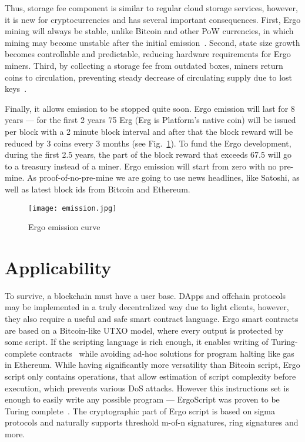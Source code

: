 \documentclass[]{article}
\begin{document}
    Thus, storage fee component is similar to regular cloud storage services, however, it is new for
    cryptocurrencies and has several important consequences. First, Ergo mining will always be
    stable, unlike Bitcoin and other PoW currencies, in which mining may become unstable after the
    initial emission~\cite{carlsten2016instability}. Second, state size growth becomes controllable and predictable,
    reducing hardware requirements for Ergo miners. Third, by collecting a storage fee from outdated boxes,
    miners return coins to circulation, preventing steady decrease of circulating supply due to lost
    keys~\cite{wsj2018}.

    Finally, it allows emission to be stopped quite soon. Ergo emission will
    last for 8 years --- for the
    first 2 years 75 Erg (Erg is Platform's native coin) will be issued per block with a 2 minute block
    interval and after that the block reward will be reduced by 3 coins every 3 months (see Fig.~\ref{fig:emission}).
    To fund the Ergo development, during the first 2.5 years, the part of the block reward that
    exceeds 67.5 will go to a treasury instead of a miner. Ergo emission will start from zero with no
    pre-mine. As proof-of-no-pre-mine we are going to use news headlines, like Satoshi, as well as
    latest block ids from Bitcoin and Ethereum.

    \begin{figure}[ht]
        \centering
        \texttt{[image: emission.jpg]}
        \caption{Ergo emission curve
        \label{fig:emission} }
    \end{figure}


    \section{Applicability}

    To survive, a blockchain must have a user base. DApps and offchain protocols may be
    implemented in a truly decentralized way due to light clients, however, they also require a useful
    and safe smart contract language. Ergo smart contracts are based on a Bitcoin-like UTXO
    model, where every output is protected by some script. If the scripting language is rich enough,
    it enables writing of Turing-complete contracts~\cite{chepurnoy2018self} while avoiding ad-hoc solutions for
    program halting like gas in Ethereum. While having significantly more versatility than Bitcoin
    script, Ergo script only contains operations, that allow estimation of script complexity before
    execution, which prevents various DoS attacks. However this instructions set is enough to
    easily write any possible program --- ErgoScript was proven to be Turing complete~\cite{chepurnoy2018self}. The
    cryptographic part of Ergo script is based on sigma protocols and naturally supports threshold
    m-of-n signatures, ring signatures and more.
\end{document}
